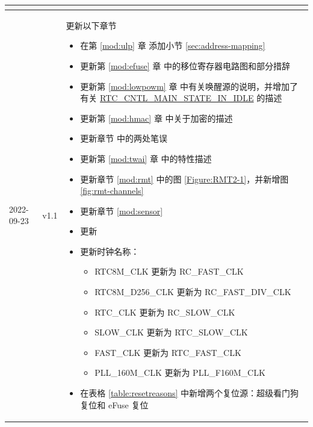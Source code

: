 \begin{longtable}[l]{ | m{2cm} | m{1.5cm} | m{12cm} | }
\begin{itemize}
    \end{itemize}
    \\\hline
    2022-09-23    & v1.1 &
    更新以下章节
    \begin{itemize}
        \item 在第 \ref{mod:ulp} 章 \textit{\nameref{mod:ulp}} 添加小节 \ref{sec:address-mapping}
        \item 更新第 \ref{mod:efuse} 章 \textit{\nameref{mod:efuse}} 中的移位寄存器电路图和部分措辞
        \item 更新第 \ref{mod:lowpowm} 章 \textit{\nameref{mod:lowpowm}} 中有关唤醒源的说明，并增加了有关 \hyperref[fielddesc:RTCCNTLMAINSTATEINIDLE]{RTC\_CNTL\_MAIN\_STATE\_IN\_IDLE} 的描述
        \item 更新第 \ref{mod:hmac} 章 \textit{\nameref{mod:hmac}} 中关于加密的描述
        \item 更新章节 \textit{\nameref{mod:usbotg}} 中的两处笔误
        \item 更新第 \ref{mod:twai} 章 \textit{\nameref{mod:twai}} 中的特性描述
        \item 更新章节 \ref{mod:rmt} \textit{\nameref{mod:rmt}} 中的图 \ref{Figure:RMT2-1}，并新增图 \ref{fig:rmt-channels}
        \item 更新章节 \ref{mod:sensor} \textit{\nameref{mod:sensor}}
        \item 更新\textit{\nameref{sec:resources}}
        \item 更新时钟名称：
        \begin{itemize}
            \item RTC8M\_CLK 更新为 RC\_FAST\_CLK
            \item RTC8M\_D256\_CLK 更新为 RC\_FAST\_DIV\_CLK
            \item RTC\_CLK 更新为 RC\_SLOW\_CLK
            \item SLOW\_CLK 更新为 RTC\_SLOW\_CLK
            \item FAST\_CLK 更新为 RTC\_FAST\_CLK
            \item PLL\_160M\_CLK 更新为 PLL\_F160M\_CLK
        \end{itemize}%
        \item 在表格 \ref{table:resetreasons} 中新增两个复位源：超级看门狗复位和 eFuse 复位
    \vspace{-1em}
    \end{itemize}
    \\\hline


\end{longtable}
